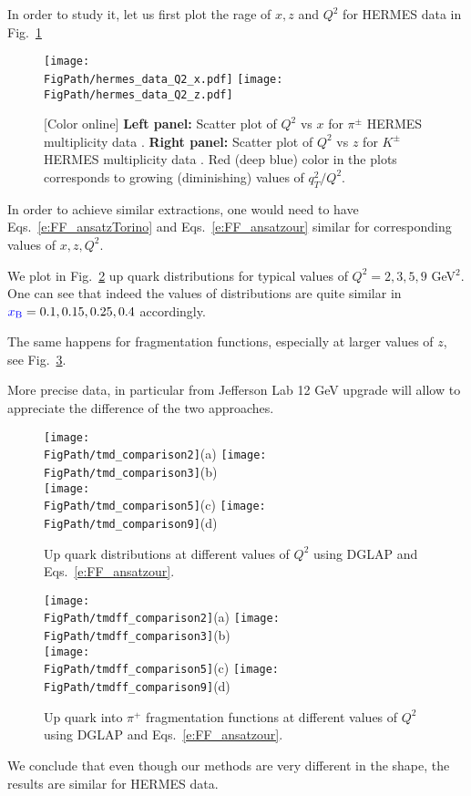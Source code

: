 \documentclass[final,3p,times,onecolumn,sort&compress,hidelinks]{elsarticle}
\newcommand{\xbj}{\ensuremath{{\cbl x_{\rm B}}}}
\newcommand\3[1]{\boldsymbol{#1}}
\newcommand{\cbl}{\color{blue}}
\newcommand*{\FigPath}{../Figs/}%
\begin{document}
In order to study it, let us first plot the rage of $x,z$ and $Q^2$ for HERMES data in Fig.~\ref{Fig:hermes_data_Q2}
\begin{figure}[htb!]
\centering
\texttt{[image: \\FigPath/hermes\_data\_Q2\_x.pdf]}
\texttt{[image: \\FigPath/hermes\_data\_Q2\_z.pdf]}
\caption{\label{Fig:hermes_data_Q2}
[Color online] {\bf Left panel:} Scatter plot of $Q^2$ vs $x$ for $\pi^\pm$ HERMES multiplicity data . {\bf Right panel:} 
Scatter plot of $Q^2$ vs $z$ for $K^\pm$ HERMES multiplicity data .  Red (deep blue) color in the plots corresponds to growing (diminishing) values of $q_T^2/Q^2$.
}
\end{figure}

In order to achieve similar extractions, one would need to have Eqs.~\eqref{e:FF_ansatzTorino} and Eqs.~\eqref{e:FF_ansatzour} similar for corresponding values of $x,z,Q^2$.

We plot in Fig.~\ref{Fig:comparison} up quark distributions for typical values of $Q^2=2,3,5,9$ GeV$^2$.
One can see that indeed the values of distributions are quite similar in $\xbj = 0.1, 0.15, 0.25, 0.4$ accordingly.

The same happens for fragmentation functions, especially at larger values of $z$, see Fig.~\ref{Fig:comparison_ff}.

More precise data, in particular from Jefferson Lab 12 GeV upgrade will allow to appreciate the difference of the two approaches.
\begin{figure}[htb!]
\centering
\texttt{[image: \\FigPath/tmd\_comparison2]}{\tiny(a)}%
\texttt{[image: \\FigPath/tmd\_comparison3]}{\tiny(b)}\\%
\texttt{[image: \\FigPath/tmd\_comparison5]}{\tiny(c)}%
\texttt{[image: \\FigPath/tmd\_comparison9]}{\tiny(d)}%
\caption{\label{Fig:comparison}
Up quark distributions  at different values of $Q^2$ using DGLAP and Eqs.~\ref{e:FF_ansatzour}.
}
\end{figure}

\begin{figure}[htb!]
\centering
\texttt{[image: \\FigPath/tmdff\_comparison2]}{\tiny(a)}%
\texttt{[image: \\FigPath/tmdff\_comparison3]}{\tiny(b)}\\%
\texttt{[image: \\FigPath/tmdff\_comparison5]}{\tiny(c)}%
\texttt{[image: \\FigPath/tmdff\_comparison9]}{\tiny(d)}%
\caption{\label{Fig:comparison_ff}
Up quark into $\pi^+$ fragmentation functions at different values of $Q^2$ using DGLAP and Eqs.~\ref{e:FF_ansatzour}.
}
\end{figure}

We conclude that even though our methods are very different in the shape, the results are similar for HERMES data.





\end{document}
